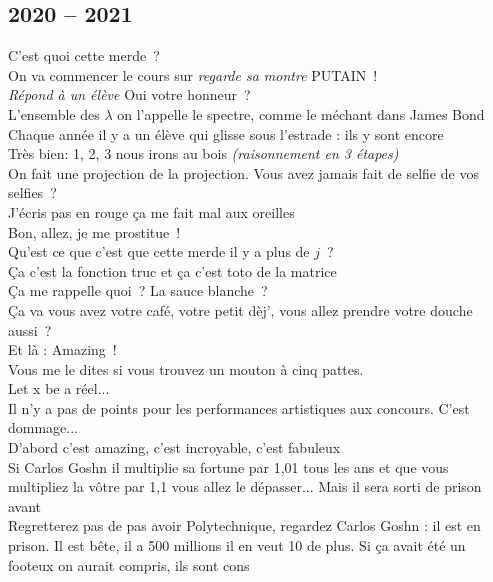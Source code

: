 \documentclass[french, a4paper, openany]{book}
\begin{document}
	\subsection*{2020 -- 2021}
		\noindent \og C'est quoi cette merde~? \fg \\
		\og On va commencer le cours sur \emph{regarde sa montre} PUTAIN~! \fg \\
		\emph{Répond à un élève} \og Oui votre honneur~? \fg \\
		\og L'ensemble des $\lambda$ on l'appelle le spectre, comme le méchant dans James Bond \fg \\
		\og Chaque année il y a un élève qui glisse sous l'estrade : ils y sont encore \fg \\
		\og Très bien: 1, 2, 3 nous irons au bois \fg \emph{(raisonnement en 3 étapes)} \\
		\og On fait une projection de la projection. Vous avez jamais fait de selfie de vos selfies~? \fg \\
		\og J'écris pas en rouge ça me fait mal aux oreilles \fg \\
		\og Bon, allez, je me prostitue~! \fg \\
		\og Qu'est ce que c'est que cette merde il y a plus de $j$~? \fg \\
		\og Ça c'est la fonction truc et ça c'est toto de la matrice \fg \\
		\og Ça me rappelle quoi~? La sauce blanche~? \fg \\
		\og Ça va vous avez votre café, votre petit dèj', vous allez prendre votre douche aussi~? \fg \\
		\og Et là : Amazing~! \fg \\
		\og Vous me le dites si vous trouvez un mouton à cinq pattes. \fg \\
		\og Let x be a réel... \fg \\
		\og Il n'y a pas de points pour les performances artistiques aux concours. C'est dommage... \fg \\
		\og D'abord c'est amazing, c'est incroyable, c'est fabuleux \fg \\
		\og Si Carlos Goshn il multiplie sa fortune par 1,01 tous les ans et que vous multipliez la vôtre par 1,1 vous allez le dépasser... Mais il sera sorti de prison avant \fg \\
		\og Regretterez pas de pas avoir Polytechnique, regardez Carlos Goshn : il est en prison. Il est bête, il a 500 millions il en veut 10 de plus. Si ça avait été un footeux on aurait compris, ils sont cons \fg \\
\end{document}
